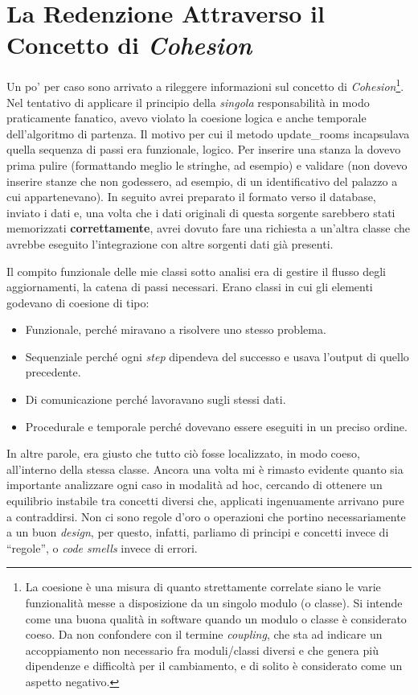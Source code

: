 \documentclass[12pt]{report}
\begin{document}
\section{La Redenzione Attraverso il Concetto di \textit{Cohesion}}
Un po' per caso sono arrivato a rileggere informazioni
sul concetto di \textit{Cohesion}\footnote{
La coesione è una misura di 
quanto strettamente correlate siano le varie funzionalità messe a disposizione 
da un singolo modulo (o classe). Si intende come una buona qualità in 
software quando un modulo o classe è considerato coeso. Da non confondere
con il termine \textit{coupling}, che sta ad indicare un accoppiamento non 
necessario fra moduli/classi diversi e che genera più dipendenze e difficoltà
per il cambiamento, e di solito è considerato come un aspetto negativo.
}.
Nel tentativo di applicare il principio della \textit{singola} responsabilità
in modo praticamente fanatico, avevo violato la coesione logica e anche
temporale dell'algoritmo di partenza. Il motivo per cui il metodo update\_rooms
incapsulava quella sequenza di passi era funzionale, logico. Per inserire 
una stanza la dovevo prima pulire (formattando meglio le stringhe, ad esempio)
e validare (non dovevo inserire stanze che non godessero, ad esempio, di un
identificativo del palazzo a cui appartenevano). In seguito avrei preparato il
formato verso il database, inviato i dati e, una volta che i dati originali
di questa sorgente sarebbero stati memorizzati \textbf{correttamente}, 
avrei dovuto 
fare una richiesta a un'altra classe che avrebbe eseguito 
l'integrazione con altre sorgenti dati già presenti. 

Il compito funzionale delle mie classi sotto analisi era di gestire il 
flusso degli aggiornamenti, la catena di passi necessari.
Erano classi in cui gli elementi godevano di coesione di tipo:

\begin{itemize}
  \item Funzionale, perché miravano a risolvere uno stesso problema.
  \item Sequenziale perché ogni \textit{step} dipendeva del successo e usava 
  l'output di quello precedente.
  \item Di comunicazione perché lavoravano sugli stessi dati.
  \item Procedurale e temporale perché dovevano essere eseguiti in un preciso
ordine.
\end{itemize}

In altre parole, era giusto che tutto ciò fosse localizzato, in modo coeso, 
all'interno della stessa classe. Ancora una volta mi è rimasto evidente
quanto sia importante analizzare ogni caso
in modalità ad hoc, cercando di ottenere un equilibrio instabile tra concetti
diversi che, applicati ingenuamente arrivano pure a contraddirsi.
Non ci sono regole d'oro o operazioni che portino necessariamente
a un buon \textit{design}, per questo, infatti, parliamo di principi
e concetti invece di ``regole'', o \textit{code smells} invece di errori.
\end{document}

